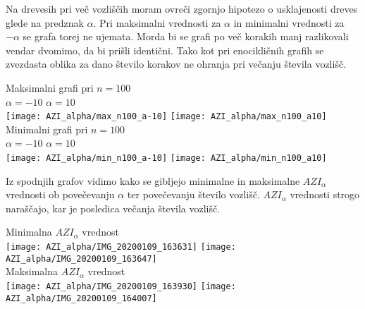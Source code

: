 \documentclass[11pt]{article} %
\begin{document}
Na drevesih pri več vozliščih moram ovreči zgornjo hipotezo o usklajenosti dreves glede na predznak $\alpha$. Pri maksimalni vrednosti za $\alpha$ in minimalni vrednosti za $-\alpha$ se grafa torej ne ujemata. Morda bi se grafi po več korakih manj razlikovali vendar dvomimo, da bi prišli identični. Tako kot pri enocikličnih grafih se zvezdasta oblika za dano število korakov ne ohranja pri večanju števila vozlišč. 

\pagebreak
\begin{center}
Maksimalni grafi pri $n=100$\\
$\alpha = -10$ \quad  \quad \quad \quad \quad \quad \quad \quad \quad \quad \quad $\alpha = 10$ \quad\\
\texttt{[image: AZI\_alpha/max\_n100\_a-10]}
\texttt{[image: AZI\_alpha/max\_n100\_a10]}\\
Minimalni grafi pri $n=100$\\
$\alpha = -10$ \quad  \quad \quad \quad \quad \quad \quad \quad \quad \quad \quad $\alpha = 10$ \quad\\
\texttt{[image: AZI\_alpha/min\_n100\_a-10]}
\texttt{[image: AZI\_alpha/min\_n100\_a10]}
\end{center}


Iz spodnjih grafov vidimo kako se gibljejo minimalne in maksimalne ${AZI}_{\alpha}$ vrednosti ob povečevanju $\alpha$ ter povečevanju število vozlišč. ${AZI}_{\alpha}$ vrednosti strogo naraščajo, kar je posledica večanja števila vozlišč.

\pagebreak
\begin{center}
Minimalna ${AZI}_{\alpha}$ vrednost\\
\texttt{[image: AZI\_alpha/IMG\_20200109\_163631]}
\texttt{[image: AZI\_alpha/IMG\_20200109\_163647]}\\
\pagebreak
Maksimalna ${AZI}_{\alpha}$ vrednost\\
\texttt{[image: AZI\_alpha/IMG\_20200109\_163930]}
\texttt{[image: AZI\_alpha/IMG\_20200109\_164007]}



\end{center}
\end{document}
